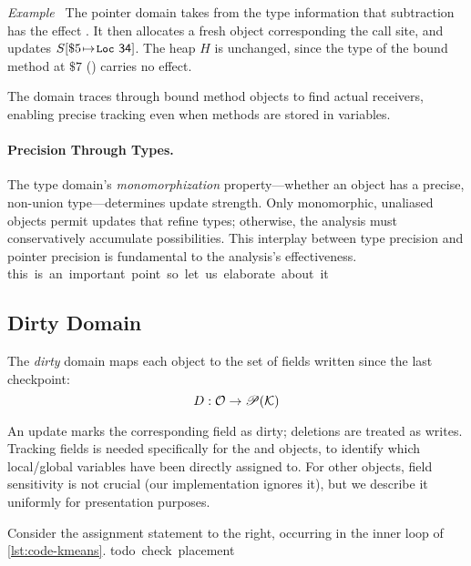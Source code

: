 \smallskip
\textit{Example~%
%
\theexample}
%
The pointer domain takes from the type information that subtraction has the effect \tnew. It then allocates a fresh object  corresponding the call site, and updates $S[\$5{\hspace{1pt}\mapsto\hspace{1pt}}\textsf{\texttt{\small Loc}~{34}}]$. The heap $H$ is unchanged, since the type of the bound method at $\$7$ () carries no \tupdate effect.
%

The domain traces through bound method objects to find actual receivers, enabling precise tracking even when methods are stored in variables.

\paragraph{Precision Through Types.}
The type domain's \emph{monomorphization} property---whether an object has a precise, non-union type---determines update strength. Only monomorphic, unaliased objects permit updates that refine types; otherwise, the analysis must conservatively accumulate possibilities. This interplay between type precision and pointer precision is fundamental to the analysis's effectiveness.
\si{this is an important point so let us elaborate about it}


\subsection{Dirty Domain}
The \emph{dirty} domain maps each object to the set of fields written since the last checkpoint:
\[D : \mathcal{O} \to \mathscr{P}(\mathcal{K})\]

An update marks the corresponding field as dirty; deletions are treated as writes. 
Tracking fields is needed specifically for the \tLOCALS and \tGLOBALS objects, to identify which local/global variables have been directly assigned to.
For other objects, field sensitivity is not crucial (our implementation ignores it),
but we describe it uniformly for presentation purposes.

\begin{example}
Consider the assignment statement to the right,
occurring in the inner loop of \cref{lst:code-kmeans}.
\si{todo check placement}
\end{example}

